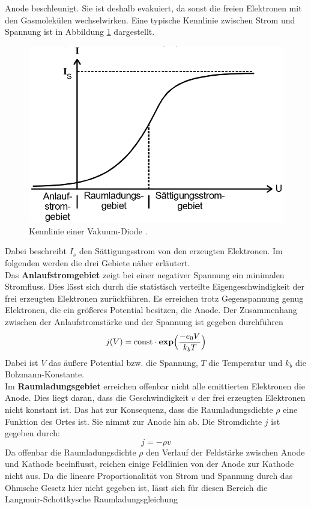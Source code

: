 Anode beschleunigt. Sie ist deshalb evakuiert, da sonst die freien Elektronen mit den Gasmolekülen wechselwirken.
Eine typische Kennlinie zwischen Strom und Spannung ist in Abbildung \ref{abb:3} dargestellt.
\begin{figure}[H]
  \centering
  \includegraphics[width=10 cm , height= 5 cm]{content/Kennlinie.png}
  \caption{Kennlinie einer Vakuum-Diode \cite{1}.}
  \label{abb:3}
\end{figure}
Dabei beschreibt $I_s$ den Sättigungsstrom von den erzeugten Elektronen.
Im folgenden werden die drei Gebiete näher erläutert.\\
Das \textbf{Anlaufstromgebiet} zeigt bei einer negativer Spannung ein minimalen Stromfluss. Dies lässt sich durch die
statistisch verteilte Eigengeschwindigkeit der frei erzeugten Elektronen zurückführen. Es erreichen trotz Gegenspannung
genug Elektronen, die ein größeres Potential besitzen, die Anode.
Der Zusammenhang zwischen der Anlaufstromstärke und der Spannung ist gegeben durchführen
\begin{equation}
  j(V) = \text{const} \cdot \textbf{exp}\Bigl(\frac{-e_0 V}{k_b T}\Bigr)
  \label{eq:1}
\end{equation}
Dabei ist $V$ das äußere Potential bzw. die Spannung, $T$ die Temperatur und $k_b$ die Bolzmann-Konstante.\\
Im \textbf{Raumladungsgebiet} erreichen offenbar nicht alle emittierten Elektronen die Anode.
Dies liegt daran, dass die Geschwindigkeit $v$ der frei erzeugten Elektronen nicht konstant ist. Das hat zur
Konsequenz, dass die Raumladungsdichte $\rho$ eine Funktion des Ortes ist. Sie nimmt zur Anode hin ab.
Die Stromdichte $j$ ist gegeben durch:
\begin{equation*}
  j = -\rho v
\end{equation*}
Da offenbar die Raumladungsdichte $\rho$ den Verlauf der Feldstärke zwischen Anode und Kathode beeinflusst,
reichen einige Feldlinien von der Anode zur Kathode nicht aus. Da die lineare Proportionalität von Strom und Spannung durch das
Ohmsche Gesetz hier nicht gegeben ist, lässt sich für diesen Bereich die Langmuir-Schottkysche Raumladungsgleichung
